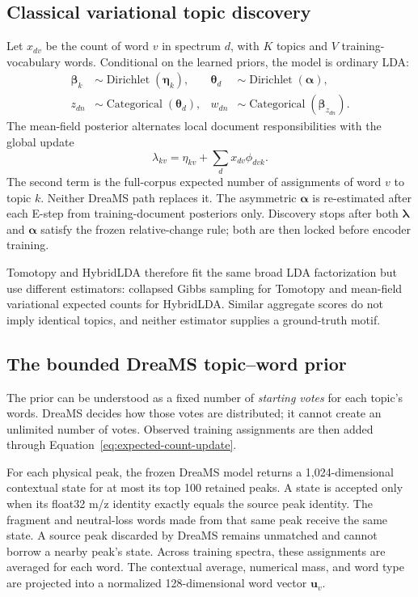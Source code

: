 \documentclass[11pt]{article}
\begin{document}
\subsection{Classical variational topic discovery}

Let $x_{dv}$ be the count of word $v$ in spectrum $d$, with $K$ topics and
$V$ training-vocabulary words. Conditional on the learned priors, the model is
ordinary LDA:
\begin{align}
  \boldsymbol\beta_k &\sim \operatorname{Dirichlet}(\boldsymbol\eta_k), &
  \boldsymbol\theta_d &\sim \operatorname{Dirichlet}(\boldsymbol\alpha),\\
  z_{dn} &\sim \operatorname{Categorical}(\boldsymbol\theta_d), &
  w_{dn} &\sim \operatorname{Categorical}(\boldsymbol\beta_{z_{dn}}).
\end{align}
The mean-field posterior alternates local document responsibilities with the
global update
\begin{equation}
  \lambda_{kv}=\eta_{kv}+\sum_d x_{dv}\phi_{dvk}.
  \label{eq:expected-count-update}
\end{equation}
The second term is the full-corpus expected number of assignments of word $v$
to topic $k$. Neither DreaMS path replaces it. The asymmetric
$\boldsymbol\alpha$ is re-estimated after each E-step from training-document
posteriors only. Discovery stops after both $\boldsymbol\lambda$ and
$\boldsymbol\alpha$ satisfy the frozen relative-change rule; both are then
locked before encoder training.

Tomotopy and HybridLDA therefore fit the same broad LDA factorization but use
different estimators: collapsed Gibbs sampling for Tomotopy and mean-field
variational expected counts for HybridLDA. Similar aggregate scores do not
imply identical topics, and neither estimator supplies a ground-truth motif.

\subsection{The bounded DreaMS topic--word prior}

The prior can be understood as a fixed number of \emph{starting votes} for
each topic's words. DreaMS decides how those votes are distributed; it cannot
create an unlimited number of votes. Observed training assignments are then
added through Equation~\ref{eq:expected-count-update}.

For each physical peak, the frozen DreaMS model returns a 1,024-dimensional
contextual state for at most its top 100 retained peaks. A state is accepted
only when its float32 m/z identity exactly equals the source peak identity.
The fragment and neutral-loss words made from that same peak receive the same
state. A source peak discarded by DreaMS remains unmatched and cannot borrow a
nearby peak's state. Across training spectra, these assignments are averaged
for each word. The contextual average, numerical mass, and word type are
projected into a normalized 128-dimensional word vector $\mathbf u_v$.
\end{document}
